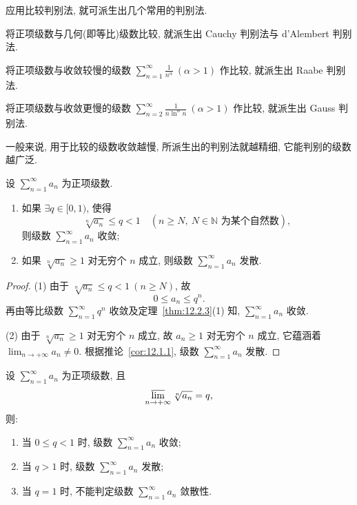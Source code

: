 应用比较判别法, 就可派生出几个常用的判别法.

将正项级数与几何(即等比)级数比较, 就派生出 Cauchy 判别法与 d'Alembert 判别法.

将正项级数与收敛较慢的级数 $\sum_{n=1}^{\infty}\frac{1}{n^{\alpha}}\ (\alpha>1)$ 作比较, 就派生出 Raabe 判别法.

将正项级数与收敛更慢的级数 $\sum_{n=2}^{\infty}\frac{1}{n\ln^{\alpha}n}\ (\alpha>1)$ 作比较, 就派生出 Gauss 判别法.

一般来说, 用于比较的级数收敛越慢, 所派生出的判别法就越精细, 它能判别的级数越广泛.

\begin{theorem}\label{thm:12.2.4}
设 $\sum_{n=1}^{\infty}a_{n}$ 为正项级数.
\begin{enumerate}
  \item 如果 $\exists q\in[0,1)$, 使得
  \[
    \sqrt[n]{a_{n}}\leqslant q<1\quad(n\geqslant N,\ N\in\mathbb{N}\text{ 为某个自然数}),
\]
  则级数 $\sum_{n=1}^{\infty}a_{n}$ 收敛;
  \item 如果 $\sqrt[n]{a_{n}}\geqslant1$ 对无穷个 $n$ 成立, 则级数 $\sum_{n=1}^{\infty}a_{n}$ 发散.
\end{enumerate}
\end{theorem}

\begin{proof}
(1) 由于 $\sqrt[n]{a_{n}}\leqslant q<1\ (n\geqslant N)$, 故
\[
  0\leqslant a_{n}\leqslant q^{n}.
\]
再由等比级数 $\sum_{n=1}^{\infty}q^{n}$ 收敛及定理~\ref{thm:12.2.3}(1) 知, $\sum_{n=1}^{\infty}a_{n}$ 收敛.

(2) 由于 $\sqrt[n]{a_{n}}\geqslant1$ 对无穷个 $n$ 成立, 故 $a_{n}\geqslant1$ 对无穷个 $n$ 成立, 它蕴涵着 $\lim_{n\to+\infty}a_{n}\neq0$. 根据推论~\ref{cor:12.1.1}, 级数 $\sum_{n=1}^{\infty}a_{n}$ 发散.
\end{proof}

\begin{theoremp}\label{thm:12.2.4p}
设 $\sum_{n=1}^{\infty}a_{n}$ 为正项级数, 且
\[
  \varlimsup_{n\to+\infty}\sqrt[n]{a_{n}}=q,
\]
则:
\begin{enumerate}
  \item 当 $0\leqslant q<1$ 时, 级数 $\sum_{n=1}^{\infty}a_{n}$ 收敛;
  \item 当 $q>1$ 时, 级数 $\sum_{n=1}^{\infty}a_{n}$ 发散;
  \item 当 $q=1$ 时, 不能判定级数 $\sum_{n=1}^{\infty}a_{n}$ 敛散性.
\end{enumerate}
\end{theoremp}

